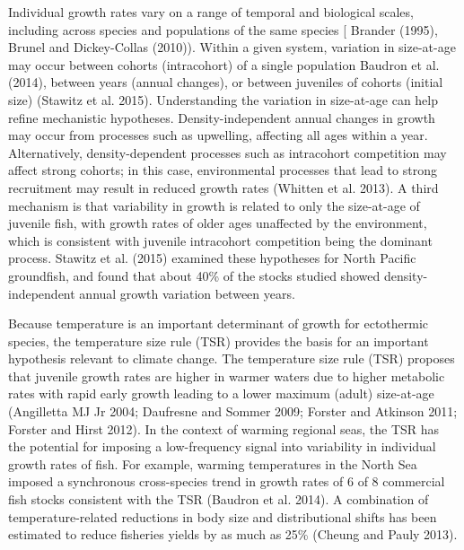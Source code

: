 \documentclass[
]{article}
\begin{document}
Individual growth rates vary on a range of temporal and biological
scales, including across species and populations of the same species {[}
Brander (1995), Brunel and Dickey-Collas (2010)). Within a given system,
variation in size-at-age may occur between cohorts (intracohort) of a
single population Baudron et al. (2014), between years (annual changes),
or between juveniles of cohorts (initial size) (Stawitz et al. 2015).
Understanding the variation in size-at-age can help refine mechanistic
hypotheses. Density-independent annual changes in growth may occur from
processes such as upwelling, affecting all ages within a year.
Alternatively, density-dependent processes such as intracohort
competition may affect strong cohorts; in this case, environmental
processes that lead to strong recruitment may result in reduced growth
rates (Whitten et al. 2013). A third mechanism is that variability in
growth is related to only the size-at-age of juvenile fish, with growth
rates of older ages unaffected by the environment, which is consistent
with juvenile intracohort competition being the dominant process.
Stawitz et al. (2015) examined these hypotheses for North Pacific
groundfish, and found that about 40\% of the stocks studied showed
density-independent annual growth variation between years.

Because temperature is an important determinant of growth for
ectothermic species, the temperature size rule (TSR) provides the basis
for an important hypothesis relevant to climate change. The temperature
size rule (TSR) proposes that juvenile growth rates are higher in warmer
waters due to higher metabolic rates with rapid early growth leading to
a lower maximum (adult) size-at-age (Angilletta MJ Jr 2004; Daufresne
and Sommer 2009; Forster and Atkinson 2011; Forster and Hirst 2012). In
the context of warming regional seas, the TSR has the potential for
imposing a low-frequency signal into variability in individual growth
rates of fish. For example, warming temperatures in the North Sea
imposed a synchronous cross-species trend in growth rates of 6 of 8
commercial fish stocks consistent with the TSR (Baudron et al. 2014). A
combination of temperature-related reductions in body size and
distributional shifts has been estimated to reduce fisheries yields by
as much as 25\% (Cheung and Pauly 2013).
\end{document}
